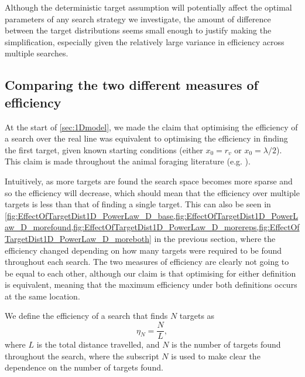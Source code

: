 Although the deterministic target assumption will potentially affect the optimal parameters of any search strategy we investigate, the amount of difference between the target distributions seems small enough to justify making the simplification, especially given the relatively large variance in efficiency across multiple searches.


\subsection{Comparing the two different measures of efficiency \label{sec:1D_assumptions:efficiency}}
At the start of \cref{sec:1Dmodel}, we made the claim that optimising the efficiency of a search over the real line was equivalent to optimising the efficiency in finding the first target, given known starting conditions (either $x_0 = r_v$ or $x_0 = \lambda/2$). This claim is made throughout the animal foraging literature (e.g. \cite{Bartumeus_2013}).

Intuitively, as more targets are found the search space becomes more sparse and so the efficiency will decrease, which should mean that the efficiency over multiple targets is less than that of finding a single target. This can also be seen in \cref{fig:EffectOfTargetDist1D_PowerLaw_D_base,fig:EffectOfTargetDist1D_PowerLaw_D_morefound,fig:EffectOfTargetDist1D_PowerLaw_D_morereps,fig:EffectOfTargetDist1D_PowerLaw_D_moreboth} in the previous section, where the efficiency changed depending on how many targets were required to be found throughout each search. The two measures of efficiency are clearly not going to be equal to each other, although our claim is that optimising for either definition is equivalent, meaning that the maximum efficiency under both definitions occurs at the same location.

We define the efficiency of a search that finds $N$ targets as
\begin{equation*}
\eta_N = \frac{N}{L}, 
\end{equation*}
where $L$ is the total distance travelled, and $N$ is the number of targets found throughout the search, where the subscript $N$ is used to make clear the dependence on the number of targets found.

